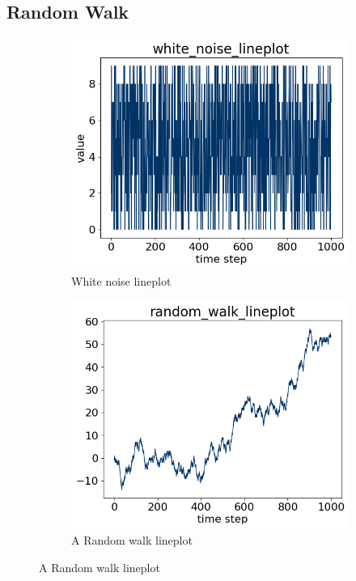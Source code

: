 
\subsection{Random Walk}

\begin{figure}[H]
  \centering
  \caption{Syntetic data, noise and random values.}
  \label{fig:dataset:white_noise_random_wald}
  \begin{subfigure}[b]{0.4\textwidth}
    \includegraphics[width=\textwidth]{./figs/code_generated/data_exploration/white_noise_lineplot.png}
    \hfill
    \caption{White noise lineplot}
    \label{fig:dataset:white_noise}
  \end{subfigure}
  \begin{subfigure}[b]{0.4\textwidth}
    \includegraphics[width=\textwidth]{./figs/code_generated/data_exploration/random_walk_lineplot.png}
    \hfill
    \caption{A Random walk lineplot}
    \label{fig:dataset:random_walk}
  \end{subfigure}
\end{figure}



